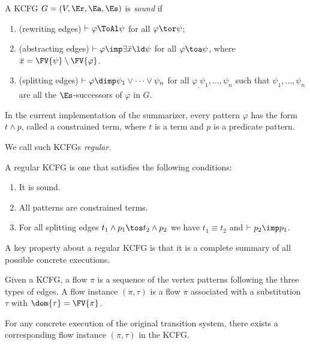 \begin{frame}
\begin{definition}
A KCFG $G = (V, \Er, \Ea, \Es)$ is \emph{sound} if
\begin{enumerate}
\item (rewriting edges) $\vdash \varphi \ToAl \psi$ for all $\varphi \tor \psi$;
\item (abstracting edges) 
   $\vdash \varphi \imp \exists \bar{x} \ld \psi$ for all $\varphi \toa \psi$,
   where $\bar{x} = \FV{\psi} \setminus \FV{\varphi}$.
\item (splitting edges) $\vdash \varphi \dimp \psi_1 \lor \dots \lor \psi_n$
 for all $\varphi_,\psi_1,\dots,\psi_n$ such that
 $\psi_1,\dots,\psi_n$ are all the $\Es$-successors of $\varphi$ in $G$.
\end{enumerate}
\end{definition}

In the current implementation of the \K summarizer, every 
pattern $\varphi$ 
has the form $t \land p$, called a constrained term,
where $t$ is a term
and $p$ is a predicate pattern.

We call such KCFGs \emph{regular}. 
\end{frame}

\begin{frame}
\begin{definition}
A regular KCFG is one that satisfies the following conditions:
\begin{enumerate}
\item It is sound.
\item All patterns are constrained terms. 
\item For all splitting edges
      $t_1 \land p_1 \tos t_2 \land p_2$ we have
      $t_1 \equiv t_2$ and $\vdash p_2 \imp p_1$.
\end{enumerate}
\end{definition}
A key property about a regular KCFG is that it is a complete summary
of all possible concrete executions.
\end{frame}

\begin{frame}

\begin{definition}
Given a KCFG, 
a flow $\pi$ is a sequence of the vertex patterns
following the three types of edges.
A flow instance $(\pi, \tau)$
is a flow $\pi$ associated with a substitution $\tau$
with $\dom{\tau} = \FV{\pi}$.
\end{definition}
\begin{theorem}
For any concrete execution of the original transition system,
there exists a corresponding flow instance
$(\pi,\tau)$ in the KCFG. 
\end{theorem}
\end{frame}

